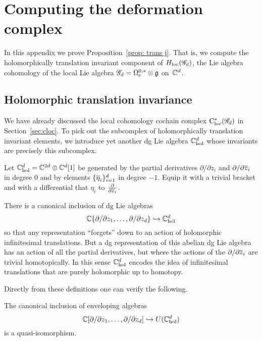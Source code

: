 \appendix


\section{Computing the deformation complex}\label{sec: hol trans}

In this appendix we prove Proposition~\ref{prop: trans j}. 
That is, we compute the holomorphically translation invariant component of $H_{\rm loc}(\sG_d)$, 
the Lie algebra cohomology of the local Lie algebra $\sG_d = \Omega^{0,*}_c \tensor \fg$ on~$\CC^d$. 

\subsection{Holomorphic translation invariance}

We have already discussed the local cohomology cochain complex $\cloc^*(\sG_d)$ in Section~\ref{sec:cloc}.
To pick out the subcomplex of holomorphically translation invariant elements,
we introduce yet another dg Lie algebra $\CC^{d}_{\rm hol}$ whose invariants are precisely this subcomplex.

\begin{dfn}
Let $\CC^{d}_{\rm hol} = \CC^{2d} \oplus \CC^d[1]$ be generated by the partial derivatives $\partial/\partial z_i$ and $\partial/\partial \zbar_i$ in degree 0 and by elements $\{\Bar{\eta}_i\}_{i=1}^d$ in degree $-1$.
Equip it with a trivial bracket and with a differential that $\eta_i$ to $\frac{\partial}{\partial \zbar_i}$.
\end{dfn}

There is a canonical inclusion of dg Lie algebras
\[
\CC\{\partial / \partial z_1, \ldots, \partial / \partial z_d\} \hookrightarrow \CC^{d}_{\rm hol}
\]
so that any representation ``forgets'' down to an action of holomorphic infinitesimal translations.
But a dg representation of this abelian dg Lie algebra has an action of all the partial derivatives,
but where the actions of the $\partial/\partial \zbar_i$ are trivial homotopically.
In this sense $\CC^{d}_{\rm hol}$ encodes the idea of infinitesimal translations that are purely holomorphic up to homotopy.

Directly from these definitions one can verify the following.

\begin{lem}
The canonical inclusion of enveloping algebras
\[
\CC[\partial / \partial z_1, \ldots, \partial / \partial z_d] \hookrightarrow U(\CC^{d}_{\rm hol})
\]
is a quasi-isomorphism.
\end{lem}

